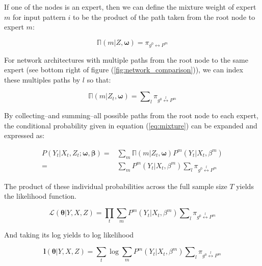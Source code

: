 \documentclass[12pt]{article}
\newcommand{\gateprod}[2]{\pi_{#1 \longleftrightarrow #2}}
\newcommand{\sumgateprod}[3]{\pi_{#1 \overset{#3}{\longleftrightarrow} #2}}
\newcommand{\shortsum}[1]{\sum \nolimits_{#1}}
\newcommand{\expmixwt}[0]{\mathbb{\Pi}}
\begin{document}
If one of the nodes is an expert, then we can define the mixture weight
of expert $m$ for input pattern $i$ to be the product of the path taken
from the root node to expert $m$:

\begin{equation} \label{eq:gpath2}
  \expmixwt(m | Z, \boldsymbol{\omega}) = \gateprod{g^{0}}{P^{m}}
\end{equation}

For network architectures with multiple paths from the root node to
the same expert (see bottom right of figure (\ref{fig:network_comparison})),
we can index these multiples paths by $l$ so that:

\begin{equation} \label{eq:pathsums}
  \expmixwt(m | Z_{t}, \boldsymbol{\omega}) = \shortsum{l} \sumgateprod{g^{0}}{P^{m}}{l} 
\end{equation}


By collecting--and summing--all possible paths from the root node to each
expert, the conditional probability given in equation (\ref{eq:mixture}) can be
expanded and expressed as:

\begin{equation} \label{eq:contribution}
  \begin{split}
    P(Y_{t}|X_{t}, Z_{t}; \boldsymbol{\omega}, \boldsymbol{\beta}) =& \sum_{m} \expmixwt(m | Z_{t}, \boldsymbol{\omega}) P^{m}(Y_{t}|X_{t},\beta^{m}) \\ 
      =& \sum_{m} P^{m}(Y_{t}|X_{t}, \beta^{m}) \shortsum{l} \sumgateprod{g^{0}}{P^{m}}{l}
  \end{split}
\end{equation}

The product of these individual probabilities across the full sample size $T$ yields
the likelihood function.

\begin{equation} \label{eq:likelihood}
  \mathcal{L}(\boldsymbol{\theta}| Y, X, Z) = \prod_{t}\sum_{m}P^{m}(Y_{t}|X_{t}, \beta^{m}) \shortsum{l} \sumgateprod{g^{0}}{P^{m}}{l}
\end{equation}

And taking its log yields to log likelihood

\begin{equation} \label{eq:loglikelihood}
  \boldsymbol{l}(\boldsymbol{\theta}|Y, X, Z) = \sum_{t}\log\sum_{m}P^{m}(Y_{t}|X_{t},\beta^{m}) \shortsum{l} \sumgateprod{g^{0}}{P^{m}}{l}
\end{equation}
\end{document}

